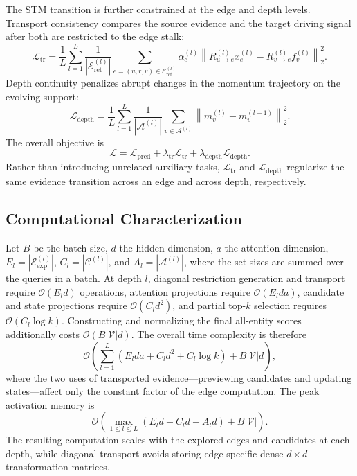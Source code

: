 \documentclass[a4paper,fleqn]{cas-sc}
\begin{document}
The STM transition is further constrained at the edge and depth levels.
Transport consistency compares the source evidence and the target driving signal
after both are restricted to the edge stalk:
\begin{equation}
\mathcal{L}_{\mathrm{tr}}
=
\frac{1}{L}\sum_{l=1}^{L}
\frac{1}{|\mathcal{E}_{\mathrm{ret}}^{(l)}|}
\sum_{e=(u,r,v)\in\mathcal{E}_{\mathrm{ret}}^{(l)}}
\alpha_e^{(l)}
\left\|
R_{u\rightarrow e}^{(l)}x_e^{(l)}
-R_{v\rightarrow e}^{(l)}f_v^{(l)}
\right\|_2^2.
\label{eq:transport_consistency}
\end{equation}
Depth continuity penalizes abrupt changes in the momentum trajectory on the
evolving support:
\begin{equation}
\mathcal{L}_{\mathrm{depth}}
=
\frac{1}{L}\sum_{l=1}^{L}
\frac{1}{|\mathcal{A}^{(l)}|}
\sum_{v\in\mathcal{A}^{(l)}}
\left\|m_v^{(l)}-\bar m_v^{(l-1)}\right\|_2^2.
\label{eq:depth_continuity}
\end{equation}
The overall objective is
\begin{equation}
\mathcal{L}
=
\mathcal{L}_{\mathrm{pred}}
+\lambda_{\mathrm{tr}}\mathcal{L}_{\mathrm{tr}}
+\lambda_{\mathrm{depth}}\mathcal{L}_{\mathrm{depth}}.
\label{eq:overall_objective}
\end{equation}
Rather than introducing unrelated auxiliary tasks,
$\mathcal{L}_{\mathrm{tr}}$ and $\mathcal{L}_{\mathrm{depth}}$ regularize the same
evidence transition across an edge and across depth, respectively.

\subsection{Computational Characterization}\label{subsec:computational_characterization}

Let $B$ be the batch size, $d$ the hidden dimension, $a$ the attention
dimension, $E_l=|\mathcal{E}_{\mathrm{exp}}^{(l)}|$,
$C_l=|\mathcal{C}^{(l)}|$, and $A_l=|\mathcal{A}^{(l)}|$, where the set sizes
are summed over the queries in a batch. At depth $l$, diagonal restriction
generation and transport require $\mathcal{O}(E_ld)$ operations, attention
projections require $\mathcal{O}(E_lda)$, candidate and state projections
require $\mathcal{O}(C_ld^2)$, and partial top-$k$ selection requires
$\mathcal{O}(C_l\log k)$. Constructing and normalizing the final all-entity
scores additionally costs $\mathcal{O}(B|\mathcal{V}|d)$. The overall time
complexity is therefore
\begin{equation}
\mathcal{O}\!\left(
\sum_{l=1}^{L}
\left(E_lda+C_ld^2+C_l\log k\right)
+B|\mathcal{V}|d
\right),
\end{equation}
where the two uses of transported evidence---previewing candidates and updating
states---affect only the constant factor of the edge computation. The peak
activation memory is
\begin{equation}
\mathcal{O}\!\left(
\max_{1\leq l\leq L}
\left(E_ld+C_ld+A_ld\right)
+B|\mathcal{V}|
\right).
\end{equation}
The resulting computation scales with the explored edges and candidates at each
depth, while diagonal transport avoids storing edge-specific dense $d\times d$
transformation matrices.
\end{document}

